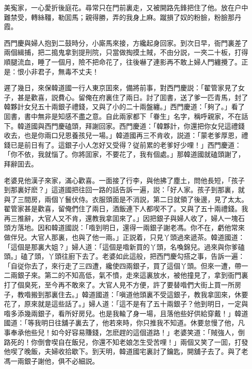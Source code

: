 美寃家，一心愛折後庭花。尋常只在門前裏走，又被開路先鋒把住了他。放在户中難禁受，轉絲韁，勒囬馬；親得勝，弄的我身上麻。蹴損了奴的粉臉，粉臉那丹霞。

西門慶與婦人抱到二鼓時分，小廝馬來接，方纔起身回家。到次日早，衙門裏差了兩個緝捕，把二搗鬼拿到提刑院，只當做掏摸土賊，不由分説，一夾二十板，打得順腿流血，睡了一個月，險不把命花了，往後嚇了連影再不敢上婦人門纏攪了。正是：恨小非君子，無毒不丈夫！

遲了幾日，來保韓道國一行人東京囬來，備將前事，對西門慶説：「翟管家見了女子，甚是歡喜，説費心。留俺在府裏住了兩日。討了囬書，送了爹一匹青馬，封了韓夥計女兒五十兩銀子禮錢，又與了小的二十兩盤纏。」西門慶道：「夠了。」看了囬書，書中無非是知感不盡之意。自此兩家都下「眷生」名字，稱呼親家，不在話下。韓道國與西門慶磕頭，拜謝回家。西門慶道：「韓夥計，你還把你女兒這禮錢收去，也是你兩口兒恩養孩兒一場。」韓道國再三不肯收，説道：「蒙老爹厚恩，禮錢已是前日有了。這銀子小人怎好又受得？従前累的老爹好少哩！」西門慶道：「你不依，我就惱了。你將囬家，不要花了，我有個處。」那韓道國就磕頭謝了，拜辭囬去。

老婆見他漢子來家，滿心歡喜。一面接了行李，與他拂了塵土，問他長短，「孩子到那裏好麽？」這道國把往回一路的話告訴一遍，説：「好人家。孩子到那裏，就與了三間房，兩個丫鬟伏侍。衣服頭面是不消説，第二日就領了後邊，見了太太。翟管家甚是歡喜，留俺們住了兩日，酒飯連下人都喫不了。又與了五十兩禮錢。我再三推辭，大官人又不肯，還教我拿囬來了。」因把銀子與婦人收了，婦人一塊石頭方落地。因和韓道國説：「喒到明日，還得一兩銀子謝老馮。你不在，虧他常來做伴兒。大官人那裏，也與了他一兩。」正説着，只見丫頭過來遞茶。韓道國道：「這個是那裏大姐？」婦人道：「這個是喒新買的丫頭，名喚錦兒。過來與你爹磕頭。」磕了頭，丫頭往廚下去了。老婆如此這般，把西門慶勾搭之事，告訴一遍：「自従你去了，來行走了三四遭，纔使四兩銀子，買了這個丫頭。但來一遭，帶一二兩銀子來。第二的不知高低，氣不憤，走來這裏放水，被他撞見了，拿到衙門裏打了個臭死，至今再不敢來了。大官人見不方便，許了要替喒們大街上買一所房子，教喒搬到那裏住去。」韓道國道：「嗔道他頭裏不受這銀子，教我拿囬來，休要花了，原來就是這些話了。」婦人道：「這不是有了五十兩銀子？他到明日，一定與喒多添幾兩銀子，看所好房兒。也是我輸了身一場，且落他些好供給穿戴！」韓道國道：「等我明日往舖子裏去了，他若來時，你只推我不知道。休要怠慢了他，凡事奉承他些兒！如今好容易賺錢，怎麽趕的這個道路！」老婆笑道：「賊強人，倒路死的！你倒會喫自在飯兒，你還不知老娘怎生受苦哩！」兩個又笑了一囬，打發他喫了晚飯，夫婦收拾歇下。到天明，韓道國宅裏討了鑰匙，開舖子去了。與了老馮一兩銀子謝他，俱不必細説。

